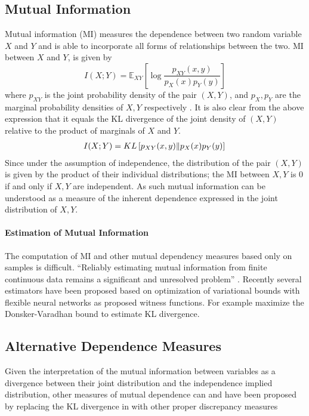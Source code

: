 \documentclass[letterpaper]{article} %
\begin{document}
\subsection{Mutual Information}
Mutual information (MI) measures the dependence between two random variable $X$ and $Y$ and is able to incorporate all forms of relationships between the two. MI between $X$ and $Y$, is given by 
$$
I(X ; Y) = \mathbb{E}_{X Y}\left[\log \frac{p_{X Y}(x, y)}{p_{X}(x) p_{Y}(y)}\right]
$$
where $p_{X Y}$ is the joint probability density of the pair $(X, Y)$, and $p_{X}, p_{Y}$ are the marginal probability densities of $X,Y$ respectively \cite{cover1999elements}. It is also clear from the above expression that it equals the KL divergence of the joint density of $(X, Y)$  relative to the product of marginals of $X$ and $Y$.
%
\begin{align}
I(X ; Y) = KL\left[ p_{X Y}(x, y) \| p_{X}(x) p_{Y}(y)\right ] {\label{eqn:MIKL}}
\end{align}
%
Since under the assumption of independence, the distribution of the pair $(X,Y)$ is given by the product of their individual distributions; the MI between $X,Y$ is 0 if and only if $X,Y$ are independent. As such mutual information can be understood as a measure of the inherent dependence expressed in the joint distribution of $X,Y$. 

\paragraph{Estimation of Mutual Information}
The computation of MI and other mutual dependency measures based only on samples is difficult. “Reliably estimating mutual information from finite continuous data remains a significant and unresolved problem” \citep{kinney2014equitability}.
Recently several estimators have been proposed based on optimization of variational bounds with flexible neural networks as proposed witness functions. For example \citet{belghazi2018mine} maximize the Donsker-Varadhan bound \citep{donsker1985large} to estimate KL divergence. 

\subsection{Alternative Dependence Measures}
Given the interpretation of the mutual information between variables as a divergence between their joint distribution and the independence implied distribution, other measures of mutual dependence can and have been proposed by replacing the KL divergence in with other proper discrepancy measures \cite{lopez2018generalization,belghazi2018mine,griffith2014intersection}
\end{document}
